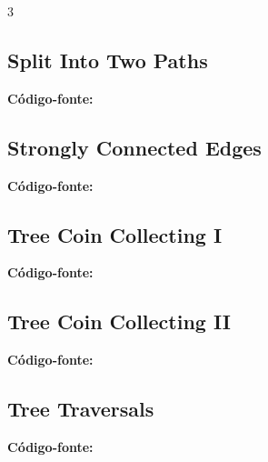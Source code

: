 \documentclass[8pt]{extarticle}
\begin{document}
\begin{multicols*}{3}
\subsection{Split Into Two Paths}
\begin{caixaenunciado}

\end{caixaenunciado}
\vspace{0.3cm}
\noindent\textbf{Código-fonte:}


\subsection{Strongly Connected Edges}
\begin{caixaenunciado}

\end{caixaenunciado}
\vspace{0.3cm}
\noindent\textbf{Código-fonte:}


\subsection{Tree Coin Collecting I}
\begin{caixaenunciado}

\end{caixaenunciado}
\vspace{0.3cm}
\noindent\textbf{Código-fonte:}


\subsection{Tree Coin Collecting II}
\begin{caixaenunciado}

\end{caixaenunciado}
\vspace{0.3cm}
\noindent\textbf{Código-fonte:}


\subsection{Tree Traversals}
\begin{caixaenunciado}

\end{caixaenunciado}
\vspace{0.3cm}
\noindent\textbf{Código-fonte:}

\end{multicols*}
\end{document}
